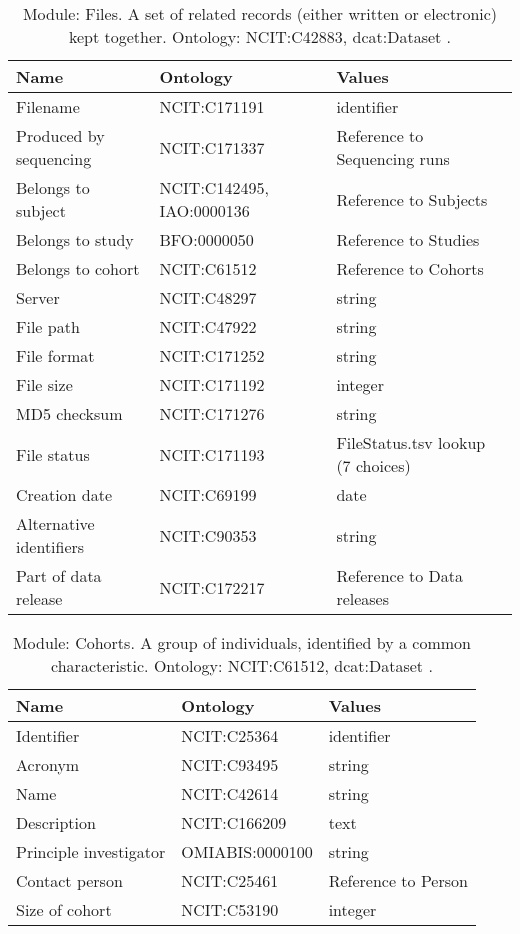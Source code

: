 \documentclass{article}
\begin{document}
\begin{table}[htb]
\begin{tabular}{lll}
Name & Ontology & Values \\
\hline
Filename & NCIT:C171191  & identifier \\
Produced by sequencing & NCIT:C171337  & Reference to Sequencing runs \\
Belongs to subject & NCIT:C142495, IAO:0000136  & Reference to Subjects \\
Belongs to study & BFO:0000050  & Reference to Studies \\
Belongs to cohort & NCIT:C61512  & Reference to Cohorts \\
Server & NCIT:C48297  & string \\
File path & NCIT:C47922  & string \\
File format & NCIT:C171252  & string \\
File size & NCIT:C171192  & integer \\
MD5 checksum & NCIT:C171276  & string \\
File status & NCIT:C171193  & FileStatus.tsv lookup (7 choices) \\
Creation date & NCIT:C69199  & date \\
Alternative identifiers & NCIT:C90353  & string \\
Part of data release & NCIT:C172217  & Reference to Data releases \\
\hline
\end{tabular}
\caption[Module: Files]{\label{table:table12} Module: Files. A set of related records (either written or electronic) kept together. Ontology: NCIT:C42883, dcat:Dataset . }
\end{table}

\begin{table}[htb]
\begin{tabular}{lll}
Name & Ontology & Values \\
\hline
Identifier & NCIT:C25364  & identifier \\
Acronym & NCIT:C93495  & string \\
Name & NCIT:C42614  & string \\
Description & NCIT:C166209  & text \\
Principle investigator & OMIABIS:0000100  & string \\
Contact person & NCIT:C25461  & Reference to Person \\
Size of cohort & NCIT:C53190  & integer \\
\hline
\end{tabular}
\caption[Module: Cohorts]{\label{table:table13} Module: Cohorts. A group of individuals, identified by a common characteristic. Ontology: NCIT:C61512, dcat:Dataset . }
\end{table}
\end{document}
